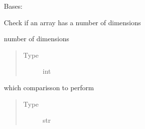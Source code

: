 \documentclass[letterpaper,10pt,english]{sphinxmanual}
\begin{document}
\begin{fulllineitems}
\label{\detokenize{dalio.validator:dalio.validator.array_val.HAS_DIMS}}
Bases: {\hyperref[\detokenize{dalio.validator:dalio.validator.validator.Validator}]{}}

Check if an array has a number of dimensions

\begin{fulllineitems}
\label{\detokenize{dalio.validator:dalio.validator.array_val.HAS_DIMS._dims}}
number of dimensions
\begin{quote}\begin{description}
\item[{Type}] \leavevmode
int

\end{description}\end{quote}

\end{fulllineitems}


\begin{fulllineitems}
\label{\detokenize{dalio.validator:dalio.validator.array_val.HAS_DIMS._comparisson}}
which comparisson to perform
\begin{quote}\begin{description}
\item[{Type}] \leavevmode
str

\end{description}\end{quote}

\end{fulllineitems}



\end{fulllineitems}
\end{document}
